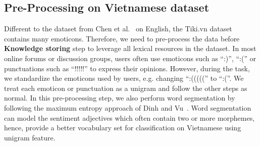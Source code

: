 \subsection{Pre-Processing on Vietnamese dataset}
Different to the dataset from Chen et al.~\cite{chen-ma-liu:2015:ACL-IJCNLP} on English, the Tiki.vn dataset contains many emoticons. 
Therefore, we need to pre-process the data before \textbf{Knowledge storing} step to leverage all lexical resources in the dataset. 
In most online forums or discussion groups, users often use emoticons such as ``:)'', ``:('' or punctuations such as ``!!!!!'' to express their opinions.
However, during the task, we standardize the emoticons used by users, e.g. changing ``:((((('' to ``:(''.
We treat each emoticon or punctuation as a unigram and follow the other steps as normal.
In this pre-processing step, we also perform word segmentation by following the maximum entropy approach of Dinh and Vu~\cite{DDien-VThuy:2006}.
Word segmentation can model the sentiment adjectives which often contain two or more morphemes, hence, provide a better vocabulary set for classification on Vietnamese using unigram feature.


%
%
%
%
%

